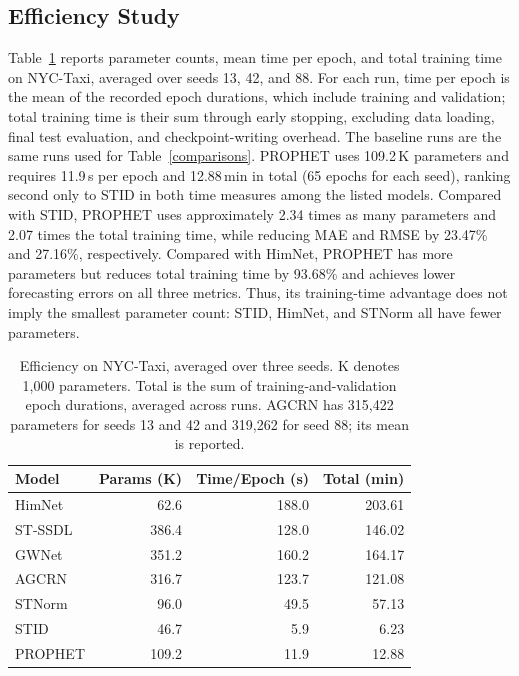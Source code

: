 \subsection{Efficiency Study}
Table~\ref{efficiency} reports parameter counts, mean time per epoch, and total training time on NYC-Taxi, averaged over seeds 13, 42, and 88.
For each run, time per epoch is the mean of the recorded epoch durations, which include training and validation; total training time is their sum through early stopping, excluding data loading, final test evaluation, and checkpoint-writing overhead.
The baseline runs are the same runs used for Table~\ref{comparisons}.
PROPHET uses 109.2\,K parameters and requires 11.9\,s per epoch and 12.88\,min in total (65 epochs for each seed), ranking second only to STID in both time measures among the listed models.
Compared with STID, PROPHET uses approximately 2.34 times as many parameters and 2.07 times the total training time, while reducing MAE and RMSE by 23.47\% and 27.16\%, respectively.
Compared with HimNet, PROPHET has more parameters but reduces total training time by 93.68\% and achieves lower forecasting errors on all three metrics.
Thus, its training-time advantage does not imply the smallest parameter count: STID, HimNet, and STNorm all have fewer parameters.

\begin{table}
\centering
\caption{Efficiency on NYC-Taxi, averaged over three seeds. K denotes 1,000 parameters. Total is the sum of training-and-validation epoch durations, averaged across runs. AGCRN has 315,422 parameters for seeds 13 and 42 and 319,262 for seed 88; its mean is reported.}
\label{efficiency}
\begin{tabular}{l r r r}
\toprule
Model & Params (K) & Time/Epoch (s) & Total (min) \\
\midrule
HimNet     & 62.6 & 188.0 & 203.61 \\
ST-SSDL    & 386.4 & 128.0 & 146.02 \\
GWNet      & 351.2 & 160.2 & 164.17 \\
AGCRN      & 316.7 & 123.7 & 121.08 \\
STNorm     & 96.0 & 49.5 & 57.13 \\
STID       & 46.7 & 5.9 & 6.23 \\
PROPHET    & 109.2 & 11.9 & 12.88 \\
\bottomrule
\end{tabular}
\end{table}

